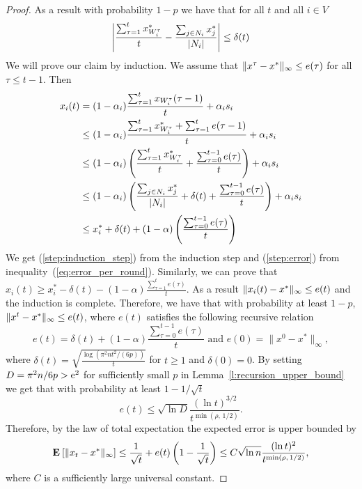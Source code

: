 \begin{proof}
  As a result with probability $1-p$ we have that for all $t$ and all $i \in V$
  \begin{equation}\label{eq:error_per_round}
    \left|
    \frac{\sum_{\tau=1}^t x^*_{W_i^\tau}}{t} -
    \frac{\sum_{j \in N_i} x^*_j}{|N_i|}
    \right| \leq \delta(t)
  \end{equation}
  We will prove our claim by induction.
  We assume that $\| x^{\tau}-x^* \|_{\infty} \leq e(\tau)$ for all
  $\tau \leq t-1$. Then
  \begin{align}
    x_i(t)
    &=
    (1-\alpha_i)\frac{\sum_{\tau=1}^{t}x_{W_i^{\tau}}(\tau-1)}{t}
    + \alpha_i s_i \nonumber \\
    &\leq
    (1-\alpha_i)\frac{\sum_{\tau=1}^{t}x^*_{W_i^{\tau}} +
      \sum_{\tau=1}^{t} e(\tau-1)}{t} + \alpha_i s_i \label{step:induction_step}\\
    &\leq
    (1-\alpha_i)
    \left(
    \frac{\sum_{\tau=1}^{t}x^*_{W_i^{\tau}}}{t}+
    \frac{\sum_{\tau=0}^{t-1} e(\tau)}{t}
    \right)
    + \alpha_i s_i \nonumber\\
    &\leq
    (1-\alpha_i)\left(\frac{\sum_{j \in N_i}x^*_{j}}{|N_i|} +
    \delta(t) + \frac{\sum_{\tau=0}^{t-1} e(\tau)}{t} \right) +
    \alpha_i s_i \label{step:error} \\
    &\leq
    x_i^* + \delta(t) + (1-\alpha)
    \left(
    \frac{\sum_{\tau=0}^{t-1} e(\tau)}{t}
    \right)
    \nonumber
  \end{align}
  We get (\ref{step:induction_step}) from the induction step and
  (\ref{step:error}) from inequality~(\ref{eq:error_per_round}).
  Similarly, we can prove that
  $x_i(t) \geq x_i^* - \delta(t) - (1-\alpha)
  \frac{\sum_{\tau=1}^t e(\tau)}{t}$.
  As a result $\| x_i(t)-x^* \|_{\infty} \leq e(t)$ and the induction
  is complete.  Therefore, we have that with probability at least $1-p$,
  \(\| x^t - x^* \|_{\infty} \leq e(t)\), where $e(t)$ satisfies the
  following recursive relation
  \[
    e(t) =
    \delta(t) + (1-\alpha)\frac{\sum_{\tau=0}^{t-1}e(\tau)}{t}
    \text{ and } e(0)=\|x^0 - x^*\|_{\infty},
  \]
  where $\delta(t) = \sqrt{ \frac{\log(\pi^2 n t^2/(6 p))}{t}}$ for $t\geq 1$
  and $\delta(0) = 0$.
  By setting $D =  \pi^2 n /6p > \mathrm{e}^2$ for sufficiently small $p$ in
  Lemma~\ref{l:recursion_upper_bound} we get that with probability at least
  $1-1/\sqrt{t}$
  \[
    e(t) \leq
    \sqrt{\ln D} \frac{(\ln t)^{3/2}}{t^{\min(\rho,\, 1/2)}}.
  \]
  Therefore, by the law of total expectation the expected error is upper
  bounded by
  \[
    \Exp{\norm{\infty}{x_t - x^*}} \leq \frac{1}{\sqrt{t}} + e(t) \lp( 1 -\frac{1}{\sqrt{t}} \rp)
    \leq C \sqrt{\ln n} \frac{(\ln t)^{2}}{t^{\min(\rho,\, 1/2)}},
  \]
  where $C$ is a sufficiently large universal constant.

\end{proof}
